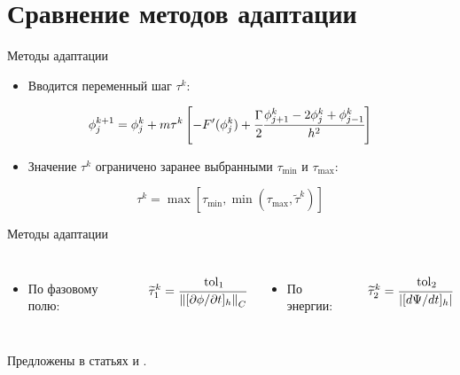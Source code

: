 
\section{Сравнение методов адаптации}

\begin{frame}{Методы адаптации}
\vspace{-3mm}
\begin{itemize}
	\item Вводится переменный шаг $\tau^k$:
\end{itemize}
\[
	\phi_j^{k + 1} = \phi_j^k + m \tau^k \left[ -F'(\phi_j^k) + \cfrac{\Gamma}{2} \cfrac{\phi_{j + 1}^k - 2 \phi_j^k + \phi_{j - 1}^k}{h^2} \right]
\]
\vspace{-3mm}
\begin{itemize}
	\item Значение $\tau^k$ ограничено заранее выбранными $\tau_{\min}$ и $\tau_{\max}$:
\end{itemize}
\vspace{1mm}
\[
	\tau^k = \max \left[ \tau_{\min}, \min( \tau_{\max}, \widetilde{\tau}^k) \right]
\]
\vspace{-7mm}
\begin{center}\begin{minipage}{0.95\textwidth}\begin{block}{Методы адаптации}
	\vspace{-2mm}
	\begin{columns}
		\begin{itemize}
			\item По фазовому полю:
		\end{itemize}
		\[
			\widetilde{\tau}_1^k = \cfrac{\operatorname{{tol}}_1}{\left\| [ \partial \phi / \partial t]_h \right\|_C}
		\]
		\begin{itemize}
			\item По энергии:
		\end{itemize}
		\[
			\widetilde{\tau}_2^k = \cfrac{\operatorname{{tol}}_2}{\left| [d \Psi / dt]_h \right|}
		\]
	\end{columns}
	\vspace{2mm}
\end{block}\end{minipage}\end{center}
\vspace{-1mm}
Предложены в статьях \cite{li_time_step} и \cite{zhang_time_step}.
\end{frame}


